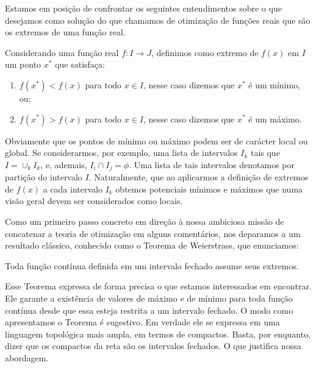 \par Estamos em posição de confrontar os seguintes entendimentos sobre o que desejamos como solução do que chamamos de otimização de funções reais que são os extremos de uma função real. 

\begin{definition}[Extremos de $f(x)$]
  Considerando uma função real $f : I \rightarrow J$, definimos como extremo de $f(x)$ em $I$ um ponto $x^*$ que satisfaça:
  \begin{enumerate}
  \item $f(x^*) < f(x)$ para todo $x \in I$, nesse caso dizemos que $x^*$ é um mínimo, ou;
  \item $f(x^*) > f(x)$ para todo $x \in I$, nesse caso dizemos que $x^*$ é um máximo.
  \end{enumerate}
\end{definition}

\par Obviamente que os pontos de mínimo ou máximo podem ser de carácter local ou global. Se considerarmos, por exemplo, uma lista de intervalos $I_k$ tais que $I = \cup_{k} I_k$, e, ademais, $I_i \cap I_j = \phi$. Uma lista de tais intervalos denotamos por partição do intervalo $I$. Naturalmente, que ao aplicarmos a definição de extremos de $f(x)$ a cada intervalo $I_k$ obtemos potenciais mínimos e máximos que numa visão geral devem ser considerados como locais. 

\par Como um primeiro passo concreto em direção à nossa ambiciosa missão de concatenar a teoria de otimização em alguns comentários, nos deparamos a um resultado clássico, conhecido como o Teorema de Weierstrass, que enunciamos:

\begin{theorem}
\label{Teorema_de_Weierstrass}
  Toda função contínua definida em um intervalo fechado assume seus extremos.
\end{theorem}

\par Esse Teorema expressa de forma precisa o que estamos interessados em encontrar. Ele garante a existência de valores de máximo e de mínimo para toda função contínua desde que essa esteja restrita a um intervalo fechado. O modo como apresentamos o Teorema é sugestivo. Em verdade ele se expressa em uma linguagem topológica mais ampla, em termos de compactos. Basta, por enquanto, dizer que os compactos da reta são os intervalos fechados. O que justifica nossa abordagem.		

